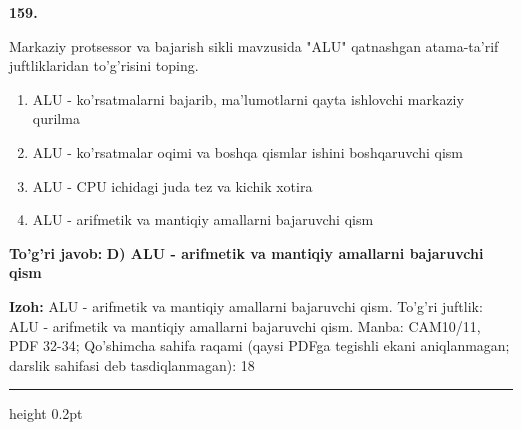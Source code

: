 \documentclass[10pt,a4paper]{article}
\begin{document}
{\bfseries\sffamily\color{ink} 159.}
\par
Markaziy protsessor va bajarish sikli mavzusida "ALU" qatnashgan atama-ta'rif juftliklaridan to'g'risini toping.
\begin{enumerate}[label=\Alph*),leftmargin=9mm]
\item ALU - ko'rsatmalarni bajarib, ma'lumotlarni qayta ishlovchi markaziy qurilma
\item ALU - ko'rsatmalar oqimi va boshqa qismlar ishini boshqaruvchi qism
\item ALU - CPU ichidagi juda tez va kichik xotira
\item ALU - arifmetik va mantiqiy amallarni bajaruvchi qism
\end{enumerate}
\begin{tcolorbox}[enhanced,breakable,colback=teal!4,colframe=teal!60!black,boxrule=0.45pt,arc=1.2mm,left=2.7mm,right=2.7mm,top=1.8mm,bottom=1.8mm,before skip=2mm,after skip=2mm]
{\bfseries\sffamily\color{teal}To'g'ri javob:} \textbf{D) ALU - arifmetik va mantiqiy amallarni bajaruvchi qism}
\par\smallskip
{\bfseries Izoh:} ALU - arifmetik va mantiqiy amallarni bajaruvchi qism. To'g'ri juftlik: ALU - arifmetik va mantiqiy amallarni bajaruvchi qism. Manba: CAM10/11, PDF 32-34; Qo'shimcha sahifa raqami (qaysi PDFga tegishli ekani aniqlanmagan; darslik sahifasi deb tasdiqlanmagan): 18
\end{tcolorbox}
\vspace{2mm}\hrule height 0.2pt\vspace{3mm}
\end{document}
